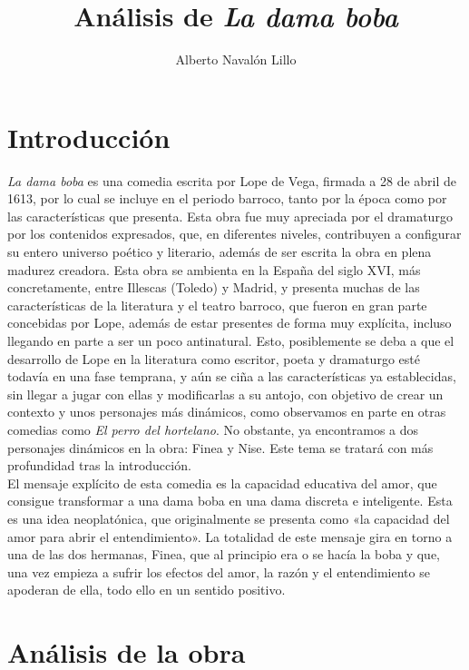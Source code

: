 \documentclass[12pt,a4paper]{article}
\title{\textbf{Análisis de \textit{La dama boba}}}
\author{Alberto Navalón Lillo}
\begin{document}
\maketitle
\tableofcontents

\section{Introducción}

\textit{La dama boba} es una comedia escrita por Lope de Vega, firmada a 28 de abril de 1613, por lo cual se incluye en el periodo barroco, tanto por la época como por las características que presenta. Esta obra fue muy apreciada por el dramaturgo por los contenidos expresados, que, en diferentes niveles, contribuyen a configurar su entero universo poético y literario, además de ser escrita la obra en plena madurez creadora. Esta obra se ambienta en la España del siglo XVI, más concretamente, entre Illescas (Toledo) y Madrid, y presenta muchas de las características de la literatura y el teatro barroco, que fueron en gran parte concebidas por Lope, además de estar presentes de forma muy explícita, incluso llegando en parte a ser un poco antinatural. Esto, posiblemente se deba a que el desarrollo de Lope en la literatura como escritor, poeta y dramaturgo esté todavía en una fase temprana, y aún se ciña a las características ya establecidas, sin llegar a jugar con ellas y modificarlas a su antojo, con objetivo de crear un contexto y unos personajes más dinámicos, como observamos en parte en otras comedias como \textit{El perro del hortelano}. No obstante, ya encontramos a dos personajes dinámicos en la obra: Finea y Nise. Este tema se tratará con más profundidad tras la introducción.\\

El mensaje explícito de esta comedia es la capacidad educativa del amor, que consigue transformar a una dama boba en una dama discreta e inteligente. Esta es una idea neoplatónica, que originalmente se presenta como «la capacidad del amor para abrir el entendimiento». La totalidad de este mensaje gira en torno a una de las dos hermanas, Finea, que al principio era o se hacía la boba y que, una vez empieza a sufrir los efectos del amor, la razón y el entendimiento se apoderan de ella, todo ello en un sentido positivo.

\section{Análisis de la obra}
\end{document}
